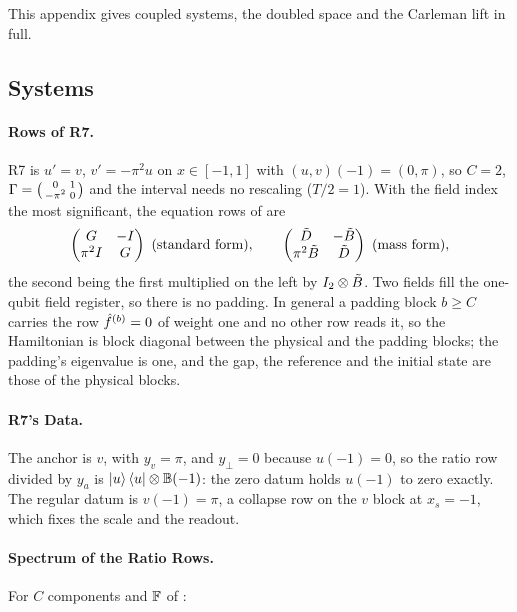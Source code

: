 This appendix gives coupled systems, the doubled space and the Carleman lift in full.

\subsection{Systems}
\label{app:systems}

\paragraph{Rows of R7.} R7 is $u'=v$, $v'=-\pi^2u$ on $x\in[-1,1]$ with $(u,v)(-1)=(0,\pi)$, so $C=2$, $\Gamma=\bigl(\begin{smallmatrix}0&1\\-\pi^2&0\end{smallmatrix}\bigr)$ and the interval needs no rescaling ($T/2=1$). With the field index the most significant, the equation rows of  are
\begin{equation}
    \begin{pmatrix}\G & -I\\ \pi^2 I & \G\end{pmatrix}\ \text{(standard form)},
    \qquad
    \begin{pmatrix}\Dt & -\Bt\\ \pi^2\Bt & \Dt\end{pmatrix}\ \text{(mass form)},
\end{equation}
the second being the first multiplied on the left by $I_2\otimes\tilde{B}$. Two fields fill the one-qubit field register, so there is no padding. In general a padding block $b\ge C$ carries the row $\hat{f}^{(b)}=0$ of weight one and no other row reads it, so the Hamiltonian is block diagonal between the physical and the padding blocks; the padding's eigenvalue is one, and the gap, the reference and the initial state are those of the physical blocks.

\paragraph{R7's Data.} The anchor is $v$, with $y_v=\pi$, and $y_\perp=0$ because $u(-1)=0$, so the ratio row divided by $y_a$ is $\ket{u}\bra{u}\otimes\mathbb{B}(-1)$: the zero datum holds $u(-1)$ to zero exactly. The regular datum is $v(-1)=\pi$, a collapse row on the $v$ block at $x_s=-1$, which fixes the scale and the readout.

\paragraph{Spectrum of the Ratio Rows.} For $C$ components and $\mathbb{F}$ of :

